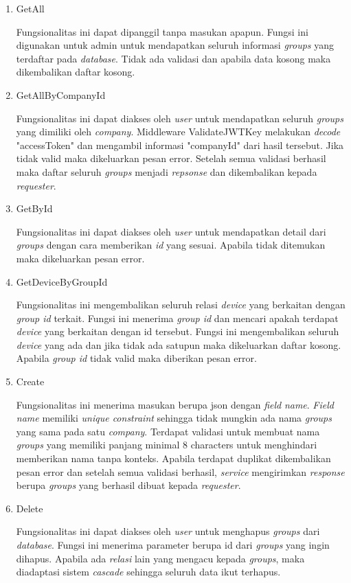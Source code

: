 \begin{enumerate}
  \item GetAll

        Fungsionalitas ini dapat dipanggil tanpa masukan apapun. Fungsi ini digunakan untuk admin untuk mendapatkan seluruh informasi \textit{groups} yang terdaftar pada \textit{database}. Tidak ada validasi dan apabila data kosong maka dikembalikan daftar kosong.

  \item GetAllByCompanyId

        Fungsionalitas ini dapat diakses oleh \textit{user} untuk mendapatkan seluruh \textit{groups} yang dimiliki oleh \textit{company}. Middleware ValidateJWTKey  melakukan \textit{decode} "accessToken" dan mengambil informasi "companyId" dari hasil tersebut. Jika tidak valid maka dikeluarkan pesan error. Setelah semua validasi berhasil maka daftar seluruh \textit{groups} menjadi \textit{repsonse} dan dikembalikan kepada \textit{requester}.

  \item GetById

        Fungsionalitas ini dapat diakses oleh \textit{user} untuk mendapatkan detail dari \textit{groups} dengan cara memberikan \textit{id} yang sesuai. Apabila tidak ditemukan maka dikeluarkan pesan error.

  \item GetDeviceByGroupId


        Fungsionalitas ini mengembalikan seluruh relasi \textit{device} yang berkaitan dengan \textit{group id} terkait. Fungsi ini menerima \textit{group id} dan mencari apakah terdapat \textit{device} yang berkaitan dengan id tersebut. Fungsi ini mengembalikan seluruh \textit{device} yang ada dan jika tidak ada satupun maka dikeluarkan daftar kosong. Apabila \textit{group id} tidak valid maka diberikan pesan error.

  \item Create

        Fungsionalitas ini menerima masukan berupa json dengan \textit{field} \textit{name}. \textit{Field name} memiliki \textit{unique constraint} sehingga tidak mungkin ada nama \textit{groups} yang sama pada satu \textit{company}. Terdapat validasi untuk membuat nama \textit{groups} yang memiliki panjang minimal 8 characters untuk menghindari memberikan nama tanpa konteks. Apabila terdapat duplikat dikembalikan pesan error dan setelah semua validasi berhasil, \textit{service} mengirimkan \textit{response} berupa \textit{groups} yang berhasil dibuat kepada \textit{requester}.

  \item Delete

        Fungsionalitas ini dapat diakses oleh \textit{user} untuk menghapus \textit{groups} dari \textit{database}. Fungsi ini menerima parameter berupa id dari \textit{groups} yang ingin dihapus. Apabila ada \textit{relasi} lain yang mengacu kepada \textit{groups}, maka diadaptasi sistem \textit{cascade} sehingga seluruh data ikut terhapus.

\end{enumerate}



